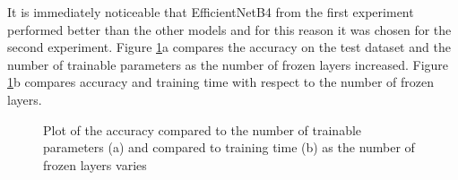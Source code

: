 It is immediately noticeable that EfficientNetB4 from the first experiment performed better than the other models and for this reason it was chosen for the second experiment. Figure \ref{fig:time_acc}a compares the accuracy on the test dataset and the number of trainable parameters as the number of frozen layers increased. Figure \ref{fig:time_acc}b compares accuracy and training time with respect to the number of frozen layers. 


\begin{figure}
    \centering
    \caption{Plot of the accuracy compared to the number of trainable parameters (a) and compared to training time (b) as the number of frozen layers varies}
    \label{fig:time_acc}
\end{figure}




